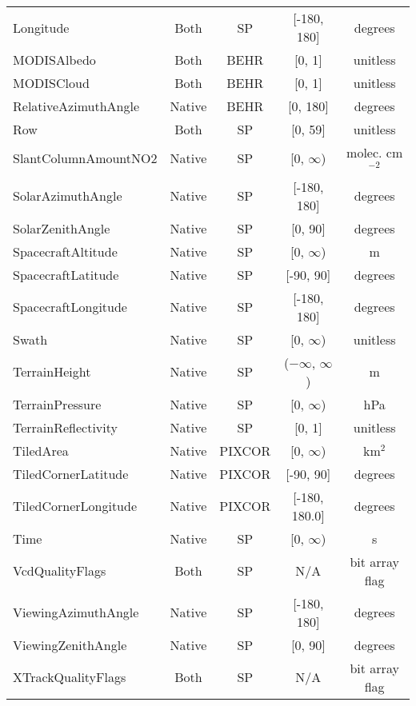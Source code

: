 \documentclass[12pt]{article}
\begin{document}
\begin{center}
\begin{longtable}{lcccc}
	Longitude			& 	Both 		& 	SP			&	[-180, 180] & degrees \\
	MODISAlbedo			&	Both		 	&	BEHR			&	[0, 1]	 & unitless \\
	MODISCloud			&	Both 		&	BEHR			&	[0, 1]	 & unitless \\
	RelativeAzimuthAngle &	Native	 	&	BEHR			&	[0, 180] & degrees \\
	Row					&	Both 		&	SP			&   [0, 59]	& unitless \\
	SlantColumnAmountNO2 & 	Native	 	&	SP			& 	[0, $\infty$) & molec. cm$^{-2}$ \\
	SolarAzimuthAngle	&	Native	 	&	SP			&	[-180, 180] & degrees \\
	SolarZenithAngle		&	Native	 	&	SP			&	[0, 90]		& degrees \\
	SpacecraftAltitude	&	Native		&	SP			&	[0, $\infty$)	& m \\
	SpacecraftLatitude	&	Native		&	SP			&	[-90, 90]	& degrees \\
	SpacecraftLongitude	&	Native		&	SP			&	[-180, 180]	& degrees \\
	Swath				&	Native	 	&	SP			&	[0, $\infty$)	& unitless \\
	TerrainHeight		&	Native	 	& 	SP			&	($-\infty$, $\infty$) 	& m \\
	TerrainPressure		&	Native	 	& 	SP			&	[0, $\infty$) 	& hPa \\
	TerrainReflectivity	&	Native 		&	SP			&	[0, 1]		& unitless \\
	TiledArea			&	Native		& 	PIXCOR		&	[0, $\infty$) & km$^{2}$ \\
	TiledCornerLatitude	&	Native		&	PIXCOR		&	[-90, 90] & degrees \\
	TiledCornerLongitude &	Native		&	PIXCOR		&	[-180, 180.0] & degrees \\
	Time					&	Native	 	&	SP			&	[0, $\infty$)	& s \\
	VcdQualityFlags		&	Both 		&	SP			&	N/A				& bit array flag \\
	ViewingAzimuthAngle	&	Native	 	&	SP			&	[-180, 180]	& degrees \\
	ViewingZenithAngle	&	Native	 	&	SP			&	[0, 90]		& degrees \\
	XTrackQualityFlags	&	Both 		&	SP			&	N/A				& bit array flag \\
	
	\end{longtable}

	\end{center}
\end{document}
